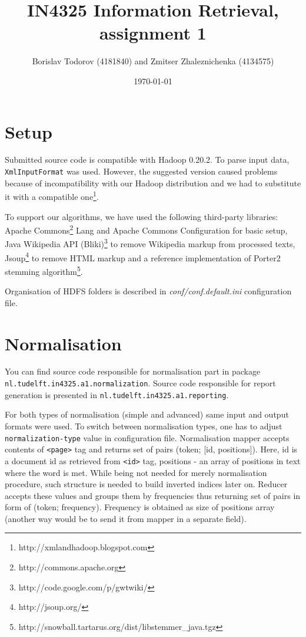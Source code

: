 \documentclass[a4paper, notitlepage]{report}
\begin{document}
\title{IN4325 Information Retrieval, assignment 1}
\author{Borislav Todorov (4181840) and Zmitser Zhaleznichenka (4134575)}
\date{\today}
\maketitle

\section{Setup}

Submitted source code is compatible with Hadoop 0.20.2. To parse input data, \lstinline{XmlInputFormat} was used. However, the suggested version caused problems because of incompatibility with our Hadoop distribution and we had to substitute it with a compatible one\footnote{http://xmlandhadoop.blogspot.com}.

To support our algorithms, we have used the following third-party libraries: Apache Commons\footnote{http://commons.apache.org} Lang and Apache Commons Configuration for basic setup, Java Wikipedia API (Bliki)\footnote{http://code.google.com/p/gwtwiki/} to remove Wikipedia markup from processed texts, Jsoup\footnote{http://jsoup.org/} to remove HTML markup and a reference implementation of Porter2 stemming algorithm\footnote{http://snowball.tartarus.org/dist/libstemmer\_java.tgz}.

Organisation of HDFS folders is described in \emph{conf/conf.default.ini} configuration file.

\section{Normalisation}

You can find source code responsible for normalisation part in package \lstinline{nl.tudelft.in4325.a1.normalization}. Source code responsible for report generation is presented in \lstinline{nl.tudelft.in4325.a1.reporting}.

For both types of normalisation (simple and advanced) same input and output formats were used. To switch between normalisation types, one has to adjust \lstinline{normalization-type} value in configuration file. Normalisation mapper accepts contents of \lstinline{<page>} tag and returns set of pairs (token; [id, positions]). Here, id is a document id as retrieved from \lstinline{<id>} tag, positions - an array of positions in text where the word is met. While being not needed for merely normalisation procedure, such structure is needed to build inverted indices later on. Reducer accepts these values and groups them by frequencies thus returning set of pairs in form of (token; frequency). Frequency is obtained as size of positions array (another way would be to send it from mapper in a separate field).
\end{document}
